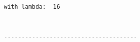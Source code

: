 \documentclass[11pt]{article}
\begin{document}
    \begin{Verbatim}[commandchars=\\\{\}]
     with lambda:  16

    \end{Verbatim}

    \begin{center}
    \end{center}
    { \hspace*{\fill} \\}
    
    \begin{Verbatim}[commandchars=\\\{\}]
--------------------------------------

    \end{Verbatim}


    
    
    
    
\end{document}

